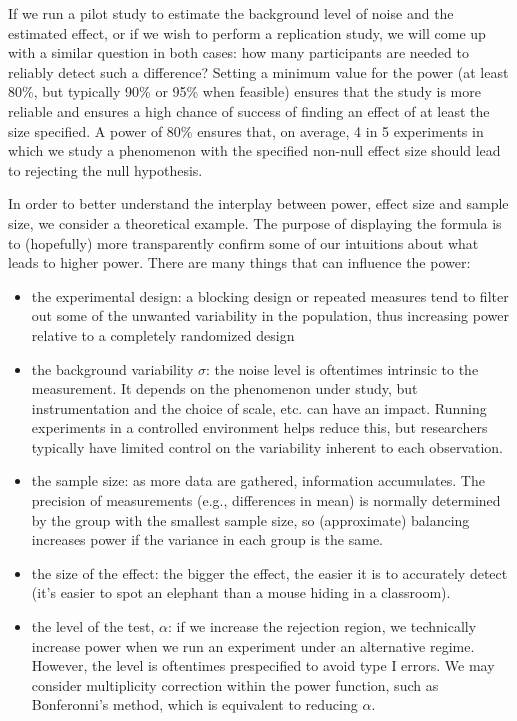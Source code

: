 \documentclass[
  11pt,
  letterpaper,
]{scrbook}
\providecommand{\tightlist}{%
  \setlength{\itemsep}{0pt}\setlength{\parskip}{0pt}}\usepackage{longtable,booktabs,array}
\theoremstyle{definition}
\theoremstyle{definition}
\theoremstyle{remark}
\begin{document}
If we run a pilot study to estimate the background level of noise and
the estimated effect, or if we wish to perform a replication study, we
will come up with a similar question in both cases: how many
participants are needed to reliably detect such a difference? Setting a
minimum value for the power (at least 80\%, but typically 90\% or 95\%
when feasible) ensures that the study is more reliable and ensures a
high chance of success of finding an effect of at least the size
specified. A power of 80\% ensures that, on average, 4 in 5 experiments
in which we study a phenomenon with the specified non-null effect size
should lead to rejecting the null hypothesis.

In order to better understand the interplay between power, effect size
and sample size, we consider a theoretical example. The purpose of
displaying the formula is to (hopefully) more transparently confirm some
of our intuitions about what leads to higher power. There are many
things that can influence the power:

\begin{itemize}
\tightlist
\item
  the experimental design: a blocking design or repeated measures tend
  to filter out some of the unwanted variability in the population, thus
  increasing power relative to a completely randomized design
\item
  the background variability \(\sigma\): the noise level is oftentimes
  intrinsic to the measurement. It depends on the phenomenon under
  study, but instrumentation and the choice of scale, etc. can have an
  impact. Running experiments in a controlled environment helps reduce
  this, but researchers typically have limited control on the
  variability inherent to each observation.
\item
  the sample size: as more data are gathered, information accumulates.
  The precision of measurements (e.g., differences in mean) is normally
  determined by the group with the smallest sample size, so
  (approximate) balancing increases power if the variance in each group
  is the same.
\item
  the size of the effect: the bigger the effect, the easier it is to
  accurately detect (it's easier to spot an elephant than a mouse hiding
  in a classroom).
\item
  the level of the test, \(\alpha\): if we increase the rejection
  region, we technically increase power when we run an experiment under
  an alternative regime. However, the level is oftentimes prespecified
  to avoid type I errors. We may consider multiplicity correction within
  the power function, such as Bonferonni's method, which is equivalent
  to reducing \(\alpha\).
\end{itemize}
\end{document}
